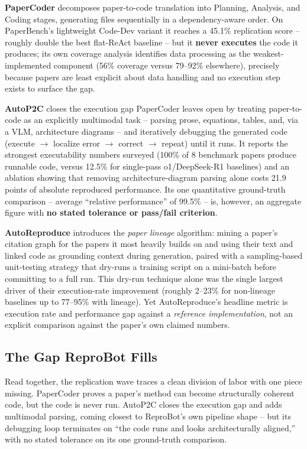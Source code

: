 \documentclass[10pt,twocolumn]{article}
\begin{document}
\textbf{PaperCoder} \cite{seo2025papercoder} decomposes paper-to-code translation into
Planning, Analysis, and Coding stages, generating files sequentially in a
dependency-aware order. On PaperBench's lightweight Code-Dev variant it reaches a 45.1\%
replication score -- roughly double the best flat-ReAct baseline -- but it
\textbf{never executes} the code it produces; its own coverage analysis identifies data
processing as the weakest-implemented component (56\% coverage versus 79--92\%
elsewhere), precisely because papers are least explicit about data handling and no
execution step exists to surface the gap.

\textbf{AutoP2C} \cite{lin2025autop2c} closes the execution gap PaperCoder leaves open by
treating paper-to-code as an explicitly multimodal task -- parsing prose, equations,
tables, and, via a VLM, architecture diagrams -- and iteratively debugging the generated
code (execute $\to$ localize error $\to$ correct $\to$ repeat) until it runs. It reports
the strongest executability numbers surveyed (100\% of 8 benchmark papers produce
runnable code, versus 12.5\% for single-pass o1/DeepSeek-R1 baselines) and an ablation
showing that removing architecture-diagram parsing alone costs 21.9 points of absolute
reproduced performance. Its one quantitative ground-truth comparison -- average
``relative performance'' of 99.5\% -- is, however, an aggregate figure with
\textbf{no stated tolerance or pass/fail criterion}.

\textbf{AutoReproduce} \cite{zhao2025autoreproduce} introduces the \emph{paper lineage}
algorithm: mining a paper's citation graph for the papers it most heavily builds on and
using their text and linked code as grounding context during generation, paired with a
sampling-based unit-testing strategy that dry-runs a training script on a mini-batch
before committing to a full run. This dry-run technique alone was the single largest
driver of their execution-rate improvement (roughly 2--23\% for non-lineage baselines up
to 77--95\% with lineage). Yet AutoReproduce's headline metric is execution rate and
performance gap against a \emph{reference implementation}, not an explicit comparison
against the paper's own claimed numbers.

\subsection{The Gap ReproBot Fills}

Read together, the replication wave traces a clean division of labor with one piece
missing. PaperCoder proves a paper's method can become structurally coherent code, but
the code is never run. AutoP2C closes the execution gap and adds multimodal parsing,
coming closest to ReproBot's own pipeline shape -- but its debugging loop terminates on
``the code runs and looks architecturally aligned,'' with no stated tolerance on its one
ground-truth comparison.
\end{document}
